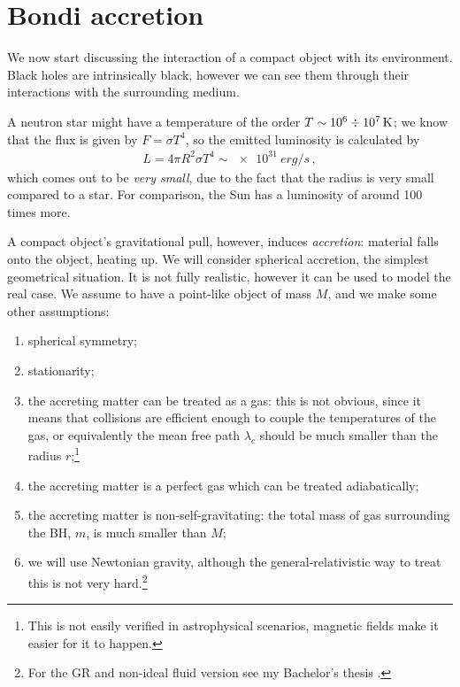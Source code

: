 \documentclass[main.tex]{subfiles}
\begin{document}
\section{Bondi accretion}


We now start discussing the interaction of a compact object with its environment.
Black holes are intrinsically black, however we can see them through their interactions with the surrounding medium.

A neutron star might have a temperature of the order \(T \sim \num{e6} \divisionsymbol\SI{e7}{K}\); we know that the flux is given by \(F = \sigma T^{4}\), so the emitted luminosity is calculated by 
%
\begin{align}
L = 4 \pi R^2 \sigma T^{4} \sim \SI{e31}{erg /s}
\,,
\end{align}
%
which comes out to be \emph{very small}, due to the fact that the radius is very small compared to a star. 
For comparison, the Sun has a luminosity of around 100 times more. 

A compact object's gravitational pull, however, induces \emph{accretion}: material falls onto the object, heating up.
We will consider spherical accretion, the simplest geometrical situation.
It is not fully realistic, however it can be used to model the real case. 
We assume to have a point-like object of mass \(M\), and we make some other assumptions: 
\begin{enumerate}
    \item spherical symmetry;
    \item stationarity;
    \item the accreting matter can be treated as a gas: this is not obvious, since it means that collisions are efficient enough to couple the temperatures of the gas, or equivalently the mean free path \(\lambda _c\) should be much smaller than the radius \(r\);\footnote{This is not easily verified in astrophysical scenarios, magnetic fields make it easier for it to happen.}
    \item the accreting matter is a perfect gas which can be treated adiabatically;
    \item the accreting matter is non-self-gravitating: the total mass of gas surrounding the BH, \(m\), is much smaller than \(M\);
    \item we will use Newtonian gravity, although the general-relativistic way to treat this is not very hard.\footnote{For the GR and non-ideal fluid version see my Bachelor's thesis \cite[]{tissinoRelativisticNonidealFlows2019}.}
\end{enumerate}
\end{document}

